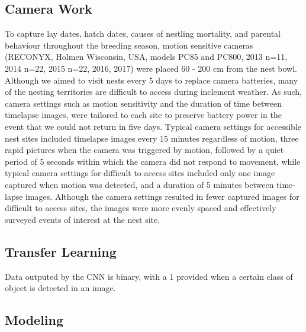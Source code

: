  
 
 
\subsection{Camera Work}

To capture lay dates, hatch dates, causes of nestling mortality, and parental behaviour throughout the breeding season, motion sensitive cameras (RECONYX, Holmen Wisconsin, USA, models PC85 and PC800, 2013 n=11, 2014 n=22, 2015 n=22, 2016, 2017)  %
were placed 60 - 200 cm from the nest bowl. 
Although we aimed to visit nests every 5 days to replace camera batteries, many of the nesting territories are difficult to access during inclement weather. 
As such, camera settings such as motion sensitivity and the duration of time between timelapse images, were tailored to each site to preserve battery power in the event that we could not return in five days.
Typical camera settings for accessible nest sites included timelapse images every 15 minutes regardless of motion, three rapid pictures when the camera was triggered by motion, followed by a quiet period of 5 seconds within which the camera did not respond to movement, while typical camera settings for difficult to access sites included only one image captured when motion was detected, and a duration of 5 minutes between time-lapse images.
Although the camera settings resulted in fewer captured images for difficult to access sites, the images were more evenly spaced and effectively surveyed events of interest at the nest site.


\subsection{Transfer Learning}

 Data outputed by the CNN is binary, with a 1 provided when a certain class of object is detected in an image.

 
 
\subsection{Modeling}

 

